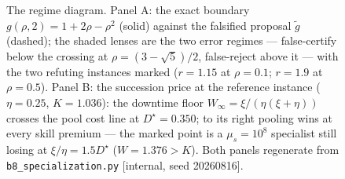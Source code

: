 \begin{figure}[t]
\begin{minipage}{0.48\textwidth}
\end{minipage}
\caption{The regime diagram. Panel A: the exact boundary $g(\rho,2)=1+2\rho-\rho^2$ (solid) against the falsified proposal
$\tilde g$ (dashed); the shaded lenses are the two error regimes --- false-certify below the crossing at $\rho=(3-\sqrt5)/2$,
false-reject above it --- with the two refuting instances marked ($r{=}1.15$ at $\rho{=}0.1$; $r{=}1.9$ at $\rho{=}0.5$). Panel B:
the succession price at the reference instance ($\eta{=}0.25$, $K{=}1.036$): the downtime floor $W_\infty=\xi/(\eta(\xi+\eta))$
crosses the pool cost line at $D^\star=0.350$; to its right pooling wins at every skill premium --- the marked point is a
$\mu_s=10^8$ specialist still losing at $\xi/\eta=1.5D^\star$ ($W=1.376>K$). Both panels regenerate from
\texttt{b8\_specialization.py} [internal, seed 20260816].}
\label{fig:regime}
\end{figure}
